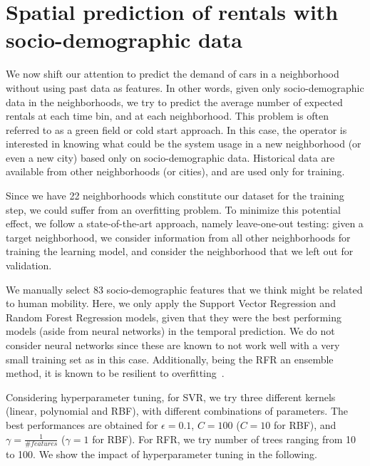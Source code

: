 \section{Spatial prediction of rentals with socio-demographic data}
\label{sec:spatial analyses}

We now shift our attention to predict the demand of cars in a neighborhood without using past data as features. In other words, given only socio-demographic data in the neighborhoods, we try to predict the average number of expected rentals at each time bin, and at each neighborhood.
This problem is often referred to as a green field or cold start approach. In this case, the operator is interested in knowing what could be the system usage in a new neighborhood (or even a new city) based only on socio-demographic data. Historical data are available from other neighborhoods (or cities), and are used only for training.

Since we have 22 neighborhoods which constitute our dataset for the training step, we could suffer from an overfitting problem. To minimize this potential effect, we follow a state-of-the-art approach, namely leave-one-out testing: given a target neighborhood, we consider information from all other neighborhoods for training the learning model, and consider the neighborhood that we left out for validation.

We manually select 83 socio-demographic features that we think might be related to human mobility.  Here, we only apply the Support Vector Regression and Random Forest Regression models, given that they were the best performing models (aside from neural networks) in the temporal prediction.
We do not consider neural networks since these are known to not work well with a very small training set as in this case.
Additionally, being the RFR an ensemble method, it is known to be resilient to overfitting~\citep{Bishop:2006}.

Considering hyperparameter tuning, for SVR, we try three different kernels (linear, polynomial and RBF), with different combinations of parameters. The best performances are obtained for $\epsilon=0.1$, $C=100$ ($C=10$ for RBF), and $\gamma=\frac{1}{\# features}$ ($\gamma=1$ for RBF). For RFR, we try number of trees ranging from 10 to 100. We show the impact of hyperparameter tuning in the following.

